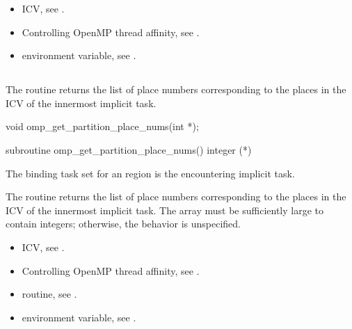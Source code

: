 \crossreferences
\begin{itemize}
\item {} ICV, see 
.

\item Controlling OpenMP thread affinity, see 
. 

\item {} environment variable, see 
.
\end{itemize}





\subsection{}
\label{subsec:omp_get_partition_place_nums}

\summary
The  routine returns the list of place numbers corresponding to the places in the  ICV of the innermost implicit task.

\format
\begin{ccppspecific}
\begin{ompcFunction}
void omp_get_partition_place_nums(int *);
\end{ompcFunction}
\end{ccppspecific}

\begin{fortranspecific}
\begin{ompfSubroutine}
subroutine omp_get_partition_place_nums()
integer (*)
\end{ompfSubroutine}
\end{fortranspecific}

\binding
The binding task set for an  region is the encountering implicit task.

\effect
The  routine returns the list of 
place numbers corresponding to the places in the  
ICV of the innermost implicit task. The array must be sufficiently large 
to contain  integers; otherwise, 
the behavior is unspecified.

\crossreferences
\begin{itemize}
\item {} ICV, see 
.

\item Controlling OpenMP thread affinity, see 
. 

\item {} routine, see 
.

\item {} environment variable, see 
.
\end{itemize}

